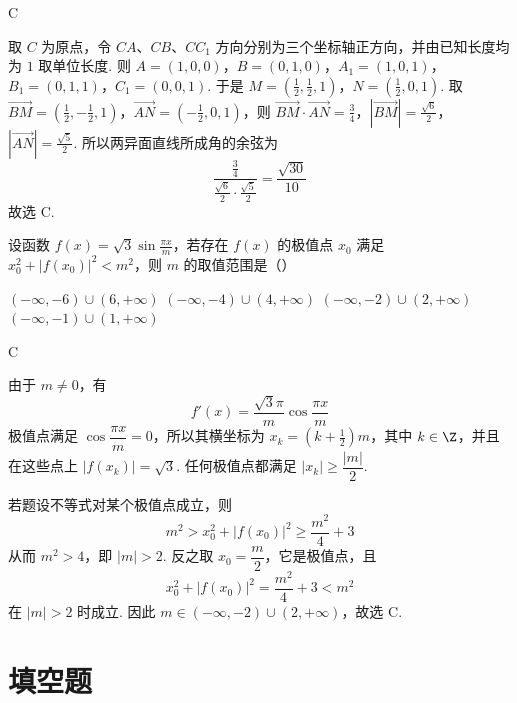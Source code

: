 \begin{answer}
C
\end{answer}

\begin{solution}
取 \(C\) 为原点，令 \(CA\)、\(CB\)、\(CC_1\) 方向分别为三个坐标轴正方向，并由已知长度均为 \(1\) 取单位长度. 则
\(A=(1,0,0)\)，\(B=(0,1,0)\)，\(A_1=(1,0,1)\)，\(B_1=(0,1,1)\)，\(C_1=(0,0,1)\).
于是
\(M=\left(\frac12,\frac12,1\right)\)，\(N=\left(\frac12,0,1\right)\).
取 \(\overrightarrow{BM}=(\frac12,-\frac12,1)\)，\(\overrightarrow{AN}=(-\frac12,0,1)\)，则
\(\overrightarrow{BM}\cdot\overrightarrow{AN}=\frac34\)，\(|\overrightarrow{BM}|=\frac{\sqrt{6}}{2}\)，\(|\overrightarrow{AN}|=\frac{\sqrt{5}}{2}\).
所以两异面直线所成角的余弦为
\[
\frac{\frac34}{\frac{\sqrt{6}}{2}\cdot\frac{\sqrt{5}}{2}}=\frac{\sqrt{30}}{10}
\]
故选 C.
\end{solution}

\begin{problem}
设函数 \(f(x)=\sqrt{3}\sin\frac{\pi x}{m}\)，若存在 \(f(x)\) 的极值点 \(x_0\) 满足 \(x_0^2+\left|f(x_0)\right|^2<m^2\)，则 \(m\) 的取值范围是（\quad）

\choices
    {\(\left(-\infty,-6\right)\cup\left(6,+\infty\right)\)}
    {\(\left(-\infty,-4\right)\cup\left(4,+\infty\right)\)}
    {\(\left(-\infty,-2\right)\cup\left(2,+\infty\right)\)}
    {\(\left(-\infty,-1\right)\cup\left(1,+\infty\right)\)}
\end{problem}

\begin{answer}
C
\end{answer}

\begin{solution}
由于 \(m\ne0\)，有
\[
f'(x)=\frac{\sqrt{3}\pi}{m}\cos\frac{\pi x}{m}
\]
极值点满足 \(\cos\dfrac{\pi x}{m}=0\)，所以其横坐标为 \(x_k=(k+\frac12)m\)，其中 \(k\in\Z\)，并且在这些点上 \(|f(x_k)|=\sqrt{3}\). 任何极值点都满足 \(|x_k|\geqslant\dfrac{|m|}{2}\).

若题设不等式对某个极值点成立，则
\[
m^2>x_0^2+|f(x_0)|^2\geqslant\frac{m^2}{4}+3
\]
从而 \(m^2>4\)，即 \(|m|>2\). 反之取 \(x_0=\dfrac{m}{2}\)，它是极值点，且
\[
x_0^2+|f(x_0)|^2=\frac{m^2}{4}+3<m^2
\]
在 \(|m|>2\) 时成立. 因此 \(m\in(-\infty,-2)\cup(2,+\infty)\)，故选 C.
\end{solution}

\section{填空题}

